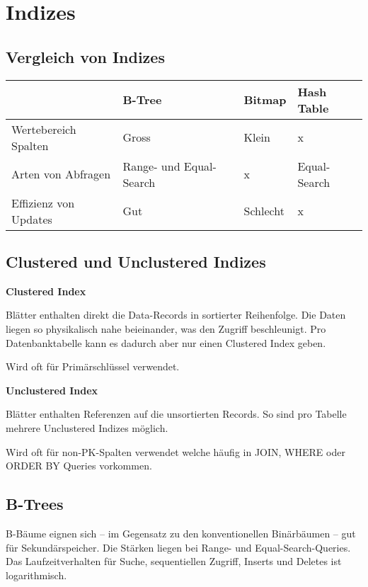 \section{Indizes}


\subsection{Vergleich von Indizes}

\begin{tabular}{*4{l|}}
	\cline{2-4}
	& \textbf{B-Tree} & \textbf{Bitmap} & \textbf{Hash Table} \\
	\hline
	\multicolumn{1}{|l|}{Wertebereich Spalten} & Gross & Klein & x \\
	\multicolumn{1}{|l|}{Arten von Abfragen} & Range- und Equal-Search & x & Equal-Search \\
	\multicolumn{1}{|l|}{Effizienz von Updates} & Gut & Schlecht & x \\
	\hline
\end{tabular}


\subsection{Clustered und Unclustered Indizes}

\textbf{Clustered Index}

Blätter enthalten direkt die Data-Records in sortierter Reihenfolge. Die Daten
liegen so physikalisch nahe beieinander, was den Zugriff beschleunigt. Pro
Datenbanktabelle kann es dadurch aber nur einen Clustered Index geben.

Wird oft für Primärschlüssel verwendet.

\textbf{Unclustered Index}

Blätter enthalten Referenzen auf die unsortierten Records. So sind pro Tabelle
mehrere Unclustered Indizes möglich.

Wird oft für non-PK-Spalten verwendet welche häufig in JOIN, WHERE oder ORDER BY
Queries vorkommen.


\subsection{B-Trees}

B-Bäume eignen sich -- im Gegensatz zu den konventionellen Binärbäumen -- gut
für Sekundärspeicher. Die Stärken liegen bei Range- und Equal-Search-Queries.
Das Laufzeitverhalten für Suche, sequentiellen Zugriff, Inserts und Deletes
ist logarithmisch.

